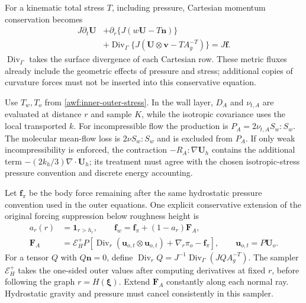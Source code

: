 \documentclass[11pt,a4paper]{article}
\numberwithin{equation}{section}
\begin{document}
For a kinematic total stress $T$, including pressure, Cartesian
momentum conservation becomes
\begin{equation}
 \boxed{\begin{aligned}
 J\partial_t\boldsymbol U
 &+\partial_r\{J(w\boldsymbol U-T\boldsymbol n)\}\\
 &+\operatorname{Div}_\Gamma
 \{J(\boldsymbol U\otimes\boldsymbol v-TA_g^{-T})\}
 =J\boldsymbol f .
 \end{aligned}}
 \label{geo:momentum}
\end{equation}
$\operatorname{Div}_\Gamma$ takes the surface divergence of each
Cartesian row.  These metric fluxes already include the geometric
effects of pressure and stress; additional copies of curvature
forces must not be inserted into this conservative equation.

Use $T_w,T_o$ from \cref{awf:inner-outer-stress}.  In the wall
layer, $D_A$ and $\nu_{t,A}$ are evaluated at distance $r$ and sample
$K$, while the isotropic covariance uses the local transported $k$.
For incompressible flow the production is
$P_A=2\nu_{t,A}S_w:S_w$.  The molecular mean-flow loss is
$2\nu S_w:S_w$ and is excluded from $P_A$.  If only weak
incompressibility is enforced, the contraction
$-R_A:\nabla\boldsymbol U_h$ contains the additional term
$-(2k_h/3)\nabla\cdot\boldsymbol U_h$; its treatment must agree with
the chosen isotropic-stress pressure convention and discrete energy
accounting.

Let $\boldsymbol f_\pi$ be the body force remaining after the same
hydrostatic pressure convention used in the outer equations.  One
explicit conservative extension of the original forcing suppression
below roughness height is
\begin{equation}
 \begin{aligned}
 a_r(r)&=\mathbf1_{r>h_r},\qquad
 \boldsymbol f_w=\boldsymbol f_\pi+(1-a_r)\boldsymbol F_A,\\
 \boldsymbol F_A&=\mathcal E_H^+P\left[
 \operatorname{Div}_r(\boldsymbol u_{o,t}\otimes\boldsymbol u_{o,t})
       +\nabla_r\pi_o-\boldsymbol f_\pi\right],
 \qquad \boldsymbol u_{o,t}=P\boldsymbol U_o .
 \end{aligned}
 \label{geo:rough-force}
\end{equation}
For a tensor $Q$ with $Q\boldsymbol n=0$, define
$\operatorname{Div}_rQ=J^{-1}\operatorname{Div}_\Gamma(JQA_g^{-T})$.
The sampler $\mathcal E_H^+$ takes the one-sided outer values after
computing derivatives at fixed $r$, before following the graph
$r=H(\boldsymbol\xi)$.  Extend $\boldsymbol F_A$ constantly along
each normal ray.  Hydrostatic gravity and pressure must cancel
consistently in this sampler.
\end{document}
